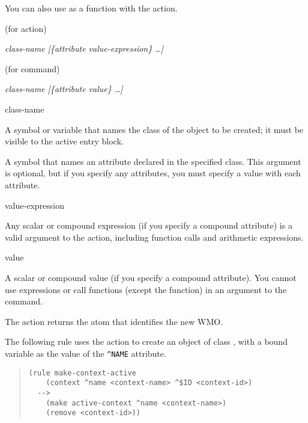 You can also use  as a function with the  action.

\Format (for action)

 \it{class-name} [\{\ct\it{attribute} \it{value-expression}\} \ldots]

\Format (for command)

 \it{class-name} [\{\ct\it{attribute} \it{value}\} \ldots]

\begin{arguments}
\item[class-name]

  A symbol or variable that names the class of the object to be
  created; it must be visible to the active entry block.

\item[\ct{attribute}]

  A symbol that names an attribute declared in the specified
  class. This argument is optional, but if you specify any attributes,
  you must specify a value with each attribute.

\item[value-expression]

  Any scalar or compound expression (if you specify a compound
  attribute) is a valid argument to the  action, including
  function calls and arithmetic expressions.

\item[value]

  A scalar or compound value (if you specify a compound
  attribute). You cannot use expressions or call functions (except the
   function) in an argument to the  command.
\end{arguments}

\ReturnValue

The  action returns the  atom that identifies
the new WMO.

\Example

The following rule uses the  action to create an object of
class , with a bound variable as the value of the
\verb|^NAME| attribute.

\begin{quote}
\begin{verbatim}
(rule make-context-active
    (context ^name <context-name> ^$ID <context-id>)
  -->
    (make active-context ^name <context-name>)
    (remove <context-id>))
\end{verbatim}
\end{quote}

